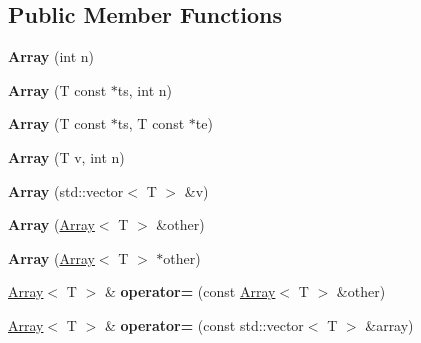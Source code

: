 \subsection*{Public Member Functions}
\begin{DoxyCompactItemize}
\item 
\mbox{\label{classzxing_1_1_array_a07fd76f65b2b65ba4105f51ae035b530}} 
{\bfseries Array} (int n)
\item 
\mbox{\label{classzxing_1_1_array_a9f6cab77f01aabb4d892394fd0bf2457}} 
{\bfseries Array} (T const $\ast$ts, int n)
\item 
\mbox{\label{classzxing_1_1_array_a90d4961f38a1415f34d399028cdf8f1c}} 
{\bfseries Array} (T const $\ast$ts, T const $\ast$te)
\item 
\mbox{\label{classzxing_1_1_array_a8fed4b2de6c00efcacf02624c52d7dad}} 
{\bfseries Array} (T v, int n)
\item 
\mbox{\label{classzxing_1_1_array_afe94524d19890ee2ff7ce21e7849d3de}} 
{\bfseries Array} (std\+::vector$<$ T $>$ \&v)
\item 
\mbox{\label{classzxing_1_1_array_a5d5917c9ede16dd6295a75404f198302}} 
{\bfseries Array} (\mbox{\hyperlink{classzxing_1_1_array}{Array}}$<$ T $>$ \&other)
\item 
\mbox{\label{classzxing_1_1_array_ac0d06c317318f5abf15730bddcfc3e7c}} 
{\bfseries Array} (\mbox{\hyperlink{classzxing_1_1_array}{Array}}$<$ T $>$ $\ast$other)
\item 
\mbox{\label{classzxing_1_1_array_af3f4be1bc864ac40a03fa7c84ee87eb6}} 
\mbox{\hyperlink{classzxing_1_1_array}{Array}}$<$ T $>$ \& {\bfseries operator=} (const \mbox{\hyperlink{classzxing_1_1_array}{Array}}$<$ T $>$ \&other)
\item 
\mbox{\label{classzxing_1_1_array_aac54caa704e7c7a274a575d71147c326}} 
\mbox{\hyperlink{classzxing_1_1_array}{Array}}$<$ T $>$ \& {\bfseries operator=} (const std\+::vector$<$ T $>$ \&array)
\item 

\end{DoxyCompactItemize}
